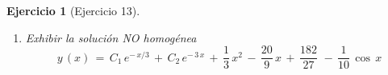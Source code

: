 \documentclass[a4paper,11pt, openany]{book}
\newtheorem{ejer}{Ejercicio}[section]
\newcommand*{\itembolasazules}[1]{%
\footnotesize\protect\tikz[baseline=-3pt]%
\protect\node[scale=.7, circle, shade, ball
color=green]{\color{white}\Large\bf#1};}
\begin{document}
\begin{ejer}[Ejercicio 13]
\begin{enumerate}[label=\itembolasazules{\arabic*}]
$$2\,-\,\dfrac{200}{9}\,=\,-\,3\,K_{0} \quad \textcolor{aurometalsaurus}{\iff} \quad -\,\dfrac{182}{9}\,=\,-\,3\,K_{0} \quad \textcolor{aurometalsaurus}{\iff} \quad \boxed{K_{0}\,=\,\dfrac{182}{27}}$$
 
$$\cos\,x: \qquad 10\,M\,=\,0 \quad \textcolor{aurometalsaurus}{\iff} \quad \boxed{M\,=\,0}$$
 
$$\sin\,x: \qquad -\,10\,N\,=\,1 \quad \textcolor{aurometalsaurus}{\iff} \quad \boxed{N\,=\,-\,\dfrac{1}{10}}$$
 
\item Exhibir la solución NO homogénea 
$$\boxed{y\,(x)\,=\,C_{1}\,e^{-\,x/3}\,+\,C_{2}\,e^{-\,3\,x}\,+\,\dfrac{1}{3}\,x^{2}\,-\,\dfrac{20}{9}\,x\,+\,\dfrac{182}{27}\,\,-\,\dfrac{1}{10}\,\cos\,x} $$
 
\end{enumerate}

\end{ejer}
 
\end{document}
